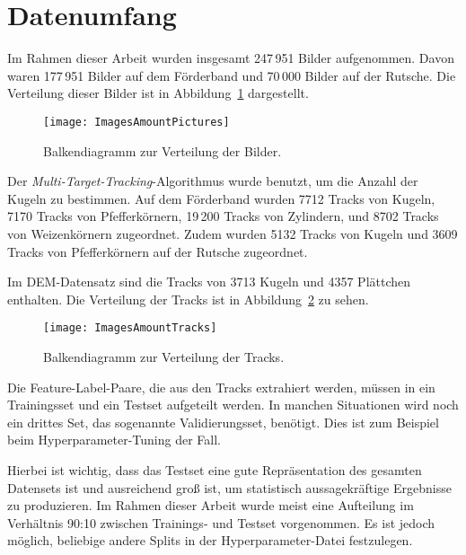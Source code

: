 \section{Datenumfang}

Im Rahmen dieser Arbeit wurden insgesamt 247\,951 Bilder aufgenommen.
Davon waren 177\,951 Bilder auf dem Förderband und 70\,000 Bilder auf der Rutsche.
Die Verteilung dieser Bilder ist in Abbildung~\ref{fig:barPics} dargestellt.

\begin{figure}[p]
	\centering
	\texttt{[image: ImagesAmountPictures]}
	\caption{Balkendiagramm zur Verteilung der Bilder.}
	\label{fig:barPics}
\end{figure}

Der \textit{Multi-Target-Tracking}-Algorithmus wurde benutzt, um die Anzahl der Kugeln zu bestimmen.
Auf dem Förderband wurden 7712 Tracks von Kugeln,
7170 Tracks von Pfefferkörnern,
19\,200 Tracks von Zylindern,
und 8702 Tracks von Weizenkörnern zugeordnet.
Zudem wurden 5132 Tracks von Kugeln und 3609 Tracks von Pfefferkörnern auf der Rutsche zugeordnet.

Im DEM-Datensatz sind die Tracks von 3713 Kugeln und 4357 Plättchen enthalten.
Die Verteilung der Tracks ist in Abbildung~\ref{fig:barTracks} zu sehen.

\begin{figure}[p]
	\centering
	\texttt{[image: ImagesAmountTracks]}
	\caption{Balkendiagramm zur Verteilung der Tracks.}
	\label{fig:barTracks}
\end{figure}

Die Feature-Label-Paare, die aus den Tracks extrahiert werden, 
müssen in ein Trainingsset und ein Testset aufgeteilt werden.
In manchen Situationen wird noch ein drittes Set, das sogenannte Validierungsset, benötigt.
Dies ist zum Beispiel beim Hyperparameter-Tuning der Fall.

Hierbei ist wichtig, dass das Testset eine gute Repräsentation des gesamten Datensets ist 
und ausreichend groß ist, um statistisch aussagekräftige Ergebnisse zu produzieren.
Im Rahmen dieser Arbeit wurde meist eine Aufteilung im Verhältnis 90:10 zwischen Trainings- und Testset vorgenommen.
Es ist jedoch möglich, beliebige andere Splits in der Hyperparameter-Datei festzulegen.



